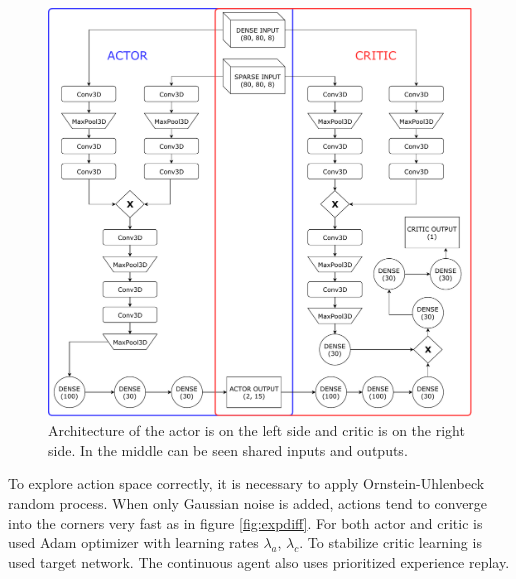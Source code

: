 \begin{figure}[!h]
\centering
\includegraphics[scale=0.55]{fig/ddpg.pdf}
\caption[Architecture of DDPG agent]{Architecture of the actor is on the left side and critic is on the right side. In the middle can be seen shared inputs and outputs.}
\label{fig:ddpg}
\end{figure}

\pagebreak
To explore action space correctly, it is necessary to apply Ornstein-Uhlenbeck random process. When only Gaussian noise is added, actions tend to converge into the corners very fast as in figure \ref{fig:expdiff}. For both actor and critic is used Adam optimizer with learning rates $\lambda_{a}$, $\lambda_{c}$. To stabilize critic learning is used target network. The continuous agent also uses prioritized experience replay.

